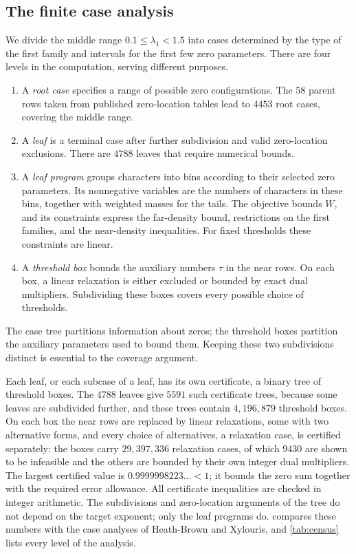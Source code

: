 \subsection{The finite case analysis}
We divide the middle range $0.1\le\lambda_1<1.5$ into cases determined by the type of the
first family and intervals for the first few zero parameters. There are four levels in
the computation, serving different purposes.
\begin{enumerate}[(1)]
  \item A \emph{root case} specifies a range of possible zero configurations.
    The $58$ parent rows taken from published zero-location tables lead to $4453$
    root cases, covering the middle range.
  \item A \emph{leaf} is a terminal case after further subdivision and valid
    zero-location exclusions. There are $4788$ leaves that require numerical bounds.
  \item A \emph{leaf program} groups characters into bins according to their selected
    zero parameters. Its nonnegative variables are the numbers of characters in these
    bins, together with weighted masses for the tails. The objective bounds $W$, and
    its constraints express the far-density bound, restrictions on the first families,
    and the near-density inequalities. For fixed thresholds these constraints are linear.
  \item A \emph{threshold box} bounds the auxiliary numbers $\tau$ in the near rows.
    On each box, a linear relaxation is either excluded or bounded by exact dual
    multipliers. Subdividing these boxes covers every possible choice of thresholds.
\end{enumerate}
The case tree partitions information about zeros; the threshold boxes partition the
auxiliary parameters used to bound them. Keeping these two subdivisions distinct is
essential to the coverage argument.

Each leaf, or each subcase of a leaf, has its own certificate, a binary tree of threshold
boxes. The $4788$ leaves give $5591$ such certificate trees, because some leaves are
subdivided further, and these trees contain $4{,}196{,}879$ threshold boxes. On each box the near
rows are replaced by linear relaxations, some with two alternative forms, and every choice of
alternatives, a relaxation case, is certified separately: the boxes carry $29{,}397{,}336$
relaxation cases, of which $9430$ are shown to be infeasible and the others are bounded by their
own integer dual multipliers. The largest certified value is
$0.9999998223\ldots<1$; it bounds the zero sum together with the required error allowance.
All certificate inequalities are checked in integer arithmetic. The subdivisions and
zero-location arguments of the tree do not depend on the target exponent; only the leaf
programs do.  compares these numbers with the case analyses of
Heath-Brown and Xylouris, and \cref{tab:census} lists every level of the analysis.

